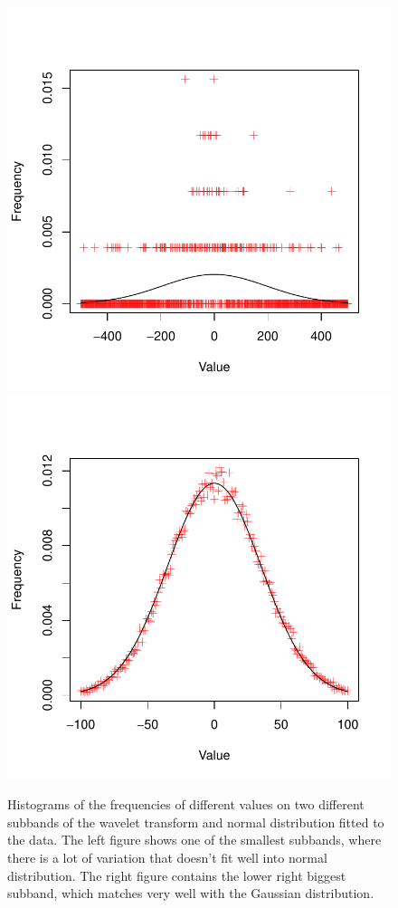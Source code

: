 \documentclass{article}
\begin{document}
\begin{figure}
    \centering
    \includegraphics[scale=0.5]{histo1}
    \includegraphics[scale=0.5]{histo15}
    \caption{Histograms of the frequencies of different values on two different subbands of the wavelet transform and normal distribution fitted to the data. The left figure shows one of the smallest subbands, where there is a lot of variation that doesn't fit well into normal distribution. The right figure contains the lower right biggest subband, which matches very well with the Gaussian distribution.}\label{fig:histo}
\end{figure}
\end{document}
